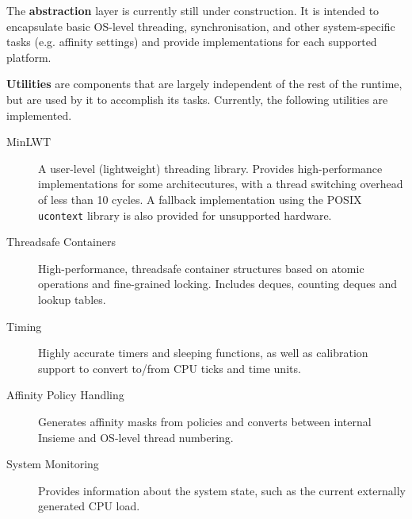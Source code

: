 The \textbf{abstraction} layer is currently still under construction.  It is intended to encapsulate basic OS-level threading, synchronisation, and other system-specific tasks (e.g. affinity settings) and provide implementations for each supported platform.

\textbf{Utilities} are components that are largely independent of the rest of the runtime, but are used by it to accomplish its tasks. Currently, the following utilities are implemented.
\begin{description}
\item[MinLWT] A user-level (lightweight) threading library. Provides high-performance implementations for some architecutures, with a thread switching overhead of less than 10 cycles. A fallback implementation using the POSIX \texttt{ucontext} library is also provided for unsupported hardware.
\item[Threadsafe Containers] High-performance, threadsafe container structures based on atomic operations and fine-grained locking. Includes deques, counting deques and lookup tables.
\item[Timing] Highly accurate timers and sleeping functions, as well as calibration support to convert to/from CPU ticks and time units.
\item[Affinity Policy Handling] Generates affinity masks from policies and converts between internal Insieme and OS-level thread numbering.
\item[System Monitoring] Provides information about the system state, such as the current externally generated CPU load.
\end{description}

